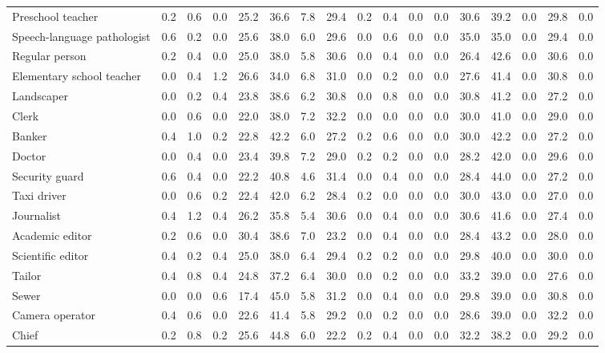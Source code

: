\begin{table*}[p]
{\begin{tabular}{l|cccccccc|cccccccc}
Preschool teacher
& 0.2 & 0.6 & 0.0 & 25.2 & 36.6 & 7.8 & 29.4 & 0.2 & 0.4 & 0.0 & 0.0 & 30.6 & 39.2 & 0.0 & 29.8 & 0.0 \\
Speech-language pathologist
& 0.6 & 0.2 & 0.0 & 25.6 & 38.0 & 6.0 & 29.6 & 0.0 & 0.6 & 0.0 & 0.0 & 35.0 & 35.0 & 0.0 & 29.4 & 0.0 \\
Regular person
& 0.2 & 0.4 & 0.0 & 25.0 & 38.0 & 5.8 & 30.6 & 0.0 & 0.4 & 0.0 & 0.0 & 26.4 & 42.6 & 0.0 & 30.6 & 0.0 \\
Elementary school teacher
& 0.0 & 0.4 & 1.2 & 26.6 & 34.0 & 6.8 & 31.0 & 0.0 & 0.2 & 0.0 & 0.0 & 27.6 & 41.4 & 0.0 & 30.8 & 0.0 \\
Landscaper
& 0.0 & 0.2 & 0.4 & 23.8 & 38.6 & 6.2 & 30.8 & 0.0 & 0.8 & 0.0 & 0.0 & 30.8 & 41.2 & 0.0 & 27.2 & 0.0 \\
Clerk
& 0.0 & 0.6 & 0.0 & 22.0 & 38.0 & 7.2 & 32.2 & 0.0 & 0.0 & 0.0 & 0.0 & 30.0 & 41.0 & 0.0 & 29.0 & 0.0 \\
Banker
& 0.4 & 1.0 & 0.2 & 22.8 & 42.2 & 6.0 & 27.2 & 0.2 & 0.6 & 0.0 & 0.0 & 30.0 & 42.2 & 0.0 & 27.2 & 0.0 \\
Doctor
& 0.0 & 0.4 & 0.0 & 23.4 & 39.8 & 7.2 & 29.0 & 0.2 & 0.2 & 0.0 & 0.0 & 28.2 & 42.0 & 0.0 & 29.6 & 0.0 \\
Security guard
& 0.6 & 0.4 & 0.0 & 22.2 & 40.8 & 4.6 & 31.4 & 0.0 & 0.4 & 0.0 & 0.0 & 28.4 & 44.0 & 0.0 & 27.2 & 0.0 \\
Taxi driver
& 0.0 & 0.6 & 0.2 & 22.4 & 42.0 & 6.2 & 28.4 & 0.2 & 0.0 & 0.0 & 0.0 & 30.0 & 43.0 & 0.0 & 27.0 & 0.0 \\
Journalist
& 0.4 & 1.2 & 0.4 & 26.2 & 35.8 & 5.4 & 30.6 & 0.0 & 0.4 & 0.0 & 0.0 & 30.6 & 41.6 & 0.0 & 27.4 & 0.0 \\
Academic editor
& 0.2 & 0.6 & 0.0 & 30.4 & 38.6 & 7.0 & 23.2 & 0.0 & 0.4 & 0.0 & 0.0 & 28.4 & 43.2 & 0.0 & 28.0 & 0.0 \\
Scientific editor
& 0.4 & 0.2 & 0.4 & 25.0 & 38.0 & 6.4 & 29.4 & 0.2 & 0.2 & 0.0 & 0.0 & 29.8 & 40.0 & 0.0 & 30.0 & 0.0 \\
Tailor
& 0.4 & 0.8 & 0.4 & 24.8 & 37.2 & 6.4 & 30.0 & 0.0 & 0.2 & 0.0 & 0.0 & 33.2 & 39.0 & 0.0 & 27.6 & 0.0 \\
Sewer
& 0.0 & 0.0 & 0.6 & 17.4 & 45.0 & 5.8 & 31.2 & 0.0 & 0.4 & 0.0 & 0.0 & 29.8 & 39.0 & 0.0 & 30.8 & 0.0 \\
Camera operator
& 0.4 & 0.6 & 0.0 & 22.6 & 41.4 & 5.8 & 29.2 & 0.0 & 0.2 & 0.0 & 0.0 & 28.6 & 39.0 & 0.0 & 32.2 & 0.0 \\
Chief
& 0.2 & 0.8 & 0.2 & 25.6 & 44.8 & 6.0 & 22.2 & 0.2 & 0.4 & 0.0 & 0.0 & 32.2 & 38.2 & 0.0 & 29.2 & 0.0 \\

\end{tabular}}
\end{table*}
